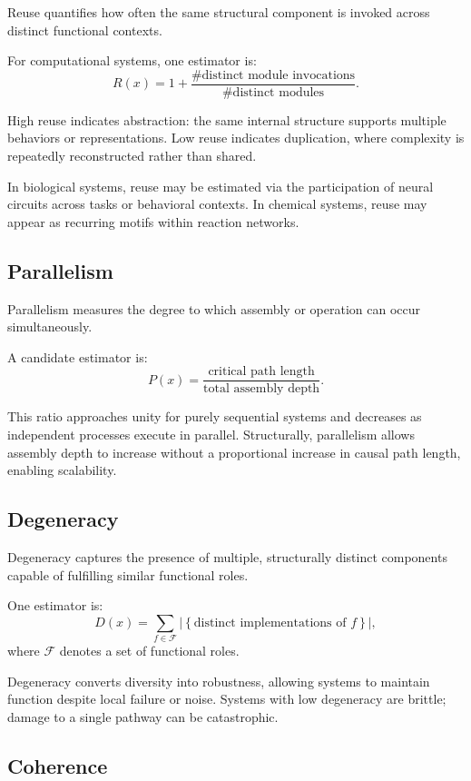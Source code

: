 \documentclass[11pt,letterpaper]{article}
\begin{document}
Reuse quantifies how often the same structural component is invoked across distinct functional contexts.

For computational systems, one estimator is:
\[
R(x) = 1 + \frac{\#\text{distinct module invocations}}{\#\text{distinct modules}}.
\]

High reuse indicates abstraction: the same internal structure supports multiple behaviors or representations. Low reuse indicates duplication, where complexity is repeatedly reconstructed rather than shared.

In biological systems, reuse may be estimated via the participation of neural circuits across tasks or behavioral contexts. In chemical systems, reuse may appear as recurring motifs within reaction networks.

\subsection{Parallelism}

Parallelism measures the degree to which assembly or operation can occur simultaneously.

A candidate estimator is:
\[
P(x) = \frac{\text{critical path length}}{\text{total assembly depth}}.
\]

This ratio approaches unity for purely sequential systems and decreases as independent processes execute in parallel. Structurally, parallelism allows assembly depth to increase without a proportional increase in causal path length, enabling scalability.

\subsection{Degeneracy}

Degeneracy captures the presence of multiple, structurally distinct components capable of fulfilling similar functional roles.

One estimator is:
\[
D(x) = \sum_{f \in \mathcal{F}} \left| \left\{ \text{distinct implementations of } f \right\} \right|,
\]
where $\mathcal{F}$ denotes a set of functional roles.

Degeneracy converts diversity into robustness, allowing systems to maintain function despite local failure or noise. Systems with low degeneracy are brittle; damage to a single pathway can be catastrophic.

\subsection{Coherence}
\end{document}
